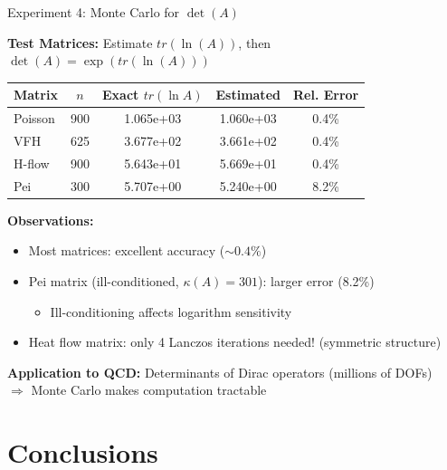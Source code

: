 \documentclass[aspectratio=169, 12pt]{beamer}
\begin{document}
\begin{frame}{Experiment 4: Monte Carlo for \(\det(A)\)}

\textbf{Test Matrices:} Estimate \(tr(\ln(A))\), then \(\det(A) = \exp(tr(\ln(A)))\)

\vspace{0.2cm}

\begin{center}
\begin{tabular}{|l|c|c|c|c|}
\hline
Matrix & \(n\) & Exact \(tr(\ln A)\) & Estimated & Rel. Error \\
\hline
Poisson & 900 & 1.065e+03 & 1.060e+03 & 0.4\% \\
VFH & 625 & 3.677e+02 & 3.661e+02 & 0.4\% \\
H-flow & 900 & 5.643e+01 & 5.669e+01 & 0.4\% \\
Pei & 300 & 5.707e+00 & 5.240e+00 & 8.2\% \\
\hline
\end{tabular}
\end{center}

\vspace{0.3cm}

\textbf{Observations:}
\begin{itemize}
    \item Most matrices: excellent accuracy (\(\sim 0.4\%\))
    \item Pei matrix (ill-conditioned, \(\kappa(A) = 301\)): larger error (8.2\%)
    \begin{itemize}
        \item Ill-conditioning affects logarithm sensitivity
    \end{itemize}
    \item Heat flow matrix: only 4 Lanczos iterations needed! (symmetric structure)
\end{itemize}

\vspace{0.2cm}

\textbf{Application to QCD:} Determinants of Dirac operators (millions of DOFs) \\
\(\Rightarrow\) Monte Carlo makes computation tractable

\end{frame}

\section{Conclusions}
\end{document}
